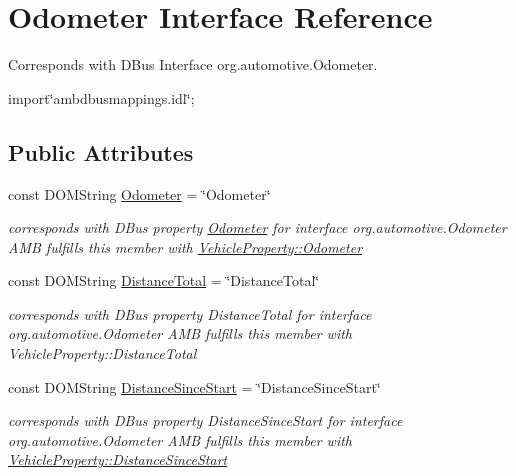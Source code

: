 \hypertarget{interfaceOdometer}{\section{Odometer Interface Reference}
\label{interfaceOdometer}
}


Corresponds with D\+Bus Interface org.\+automotive.\+Odometer.  




{\ttfamily import\char`\"{}ambdbusmappings.\+idl\char`\"{};}

\subsection*{Public Attributes}
\begin{DoxyCompactItemize}
\item 
\hypertarget{interfaceOdometer_a64dd4e3b27833d0b6a3668ad518c6a8a}{const D\+O\+M\+String \hyperlink{interfaceOdometer_a64dd4e3b27833d0b6a3668ad518c6a8a}{Odometer} = \char`\"{}Odometer\char`\"{}}\label{interfaceOdometer_a64dd4e3b27833d0b6a3668ad518c6a8a}

\begin{DoxyCompactList}\small\item\em corresponds with D\+Bus property \hyperlink{interfaceOdometer}{Odometer} for interface org.\+automotive.\+Odometer A\+M\+B fulfills this member with \hyperlink{classVehicleProperty_ad97147489a5be3babe1bb94dbb2cf970}{Vehicle\+Property\+::\+Odometer} \end{DoxyCompactList}\item 
\hypertarget{interfaceOdometer_a3157bd000bfd509e9fd6d7c09b6e36ff}{const D\+O\+M\+String \hyperlink{interfaceOdometer_a3157bd000bfd509e9fd6d7c09b6e36ff}{Distance\+Total} = \char`\"{}Distance\+Total\char`\"{}}\label{interfaceOdometer_a3157bd000bfd509e9fd6d7c09b6e36ff}

\begin{DoxyCompactList}\small\item\em corresponds with D\+Bus property Distance\+Total for interface org.\+automotive.\+Odometer A\+M\+B fulfills this member with Vehicle\+Property\+::\+Distance\+Total \end{DoxyCompactList}\item 
\hypertarget{interfaceOdometer_a0dd9d3f98892d11aadae694841237054}{const D\+O\+M\+String \hyperlink{interfaceOdometer_a0dd9d3f98892d11aadae694841237054}{Distance\+Since\+Start} = \char`\"{}Distance\+Since\+Start\char`\"{}}\label{interfaceOdometer_a0dd9d3f98892d11aadae694841237054}

\begin{DoxyCompactList}\small\item\em corresponds with D\+Bus property Distance\+Since\+Start for interface org.\+automotive.\+Odometer A\+M\+B fulfills this member with \hyperlink{classVehicleProperty_a340253da4ce8dfac2b40f3ee27d9ed4b}{Vehicle\+Property\+::\+Distance\+Since\+Start} \end{DoxyCompactList}\end{DoxyCompactItemize}


